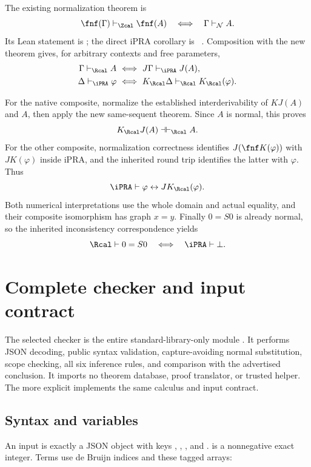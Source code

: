 The existing normalization theorem is
\[
 \fnf(\Gamma)\vdash_{\Zcal}\fnf(A)
 \quad\Longleftrightarrow\quad
 \Gamma\vdash_{\mathcal N} A.
\]
Its Lean statement is ; the direct iPRA corollary
is ~\cite{normal}. Composition with the new theorem
gives, for arbitrary contexts and free parameters,
\begin{align*}
 \Gamma\vdash_{\Rcal} A
 &\ \Longleftrightarrow\
   J\Gamma\vdash_{\iPRA}J(A),\\
 \Delta\vdash_{\iPRA}\varphi
 &\ \Longleftrightarrow\
   K_{\Rcal}\Delta\vdash_{\Rcal}K_{\Rcal}(\varphi).
\end{align*}

For the native composite, normalize the established interderivability
of \(KJ(A)\) and \(A\), then apply the new same-sequent theorem.
Since \(A\) is normal, this proves
\[
                  K_{\Rcal}J(A)\dashv\vdash_{\Rcal}A.
\]
For the other composite, normalization correctness identifies
\(J(\fnf K(\varphi))\) with \(JK(\varphi)\) inside iPRA, and the inherited
round trip identifies the latter with \(\varphi\). Thus
\[
       \iPRA\vdash \varphi\leftrightarrow J K_{\Rcal}(\varphi).
\]
Both numerical interpretations use the whole domain and actual equality,
and their composite isomorphism has graph \(x=y\). Finally \(0=S0\)
is already normal, so the inherited inconsistency correspondence yields
\[
  \Rcal\vdash 0=S0
  \quad\Longleftrightarrow\quad
  \iPRA\vdash\bot.
\]

\section{Complete checker and input contract}
\label{sec:checker}

The selected checker is the entire standard-library-only module
. It performs JSON decoding, public syntax
validation, capture-avoiding normal substitution, scope checking,
all six inference rules, and comparison with the advertised conclusion.
It imports no theorem database, proof translator, or trusted helper.
The more explicit \file{code/checker_readable.py} implements the same
calculus and input contract.

\subsection{Syntax and variables}

An input is exactly a JSON object with keys ,
, , and .
\file{variables} is a nonnegative exact integer. Terms use de Bruijn
indices and these tagged arrays:

